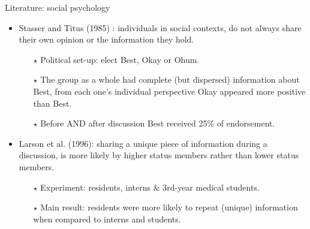 \documentclass[xcolor=table,handout]{beamer}
\begin{document}
\begin{frame}{Literature: social psychology}
\begin{itemize}
	\item Stasser and Titus (1985) : individuals in social contexts, do not always share their own opinion or the information they hold.
		\begin{itemize} \setlength\itemsep{1em}
			\item[{\color{gray}$\star$}] {\color{gray}Political set-up: elect Best, Okay or Ohum. }
			\item[{\color{gray}$\star$}] {\color{gray}The group as a whole had complete (but dispersed) information about Best, from each one’s individual perspective Okay appeared more positive than Best. }%
			\item[{\color{gray}$\star$}] {\color{gray}Before AND after discussion Best received 25\% of endorsement.} 
		\end{itemize}
		\item Larson et al. (1996): sharing a unique piece of information during a discussion, is more likely by higher status members rather than lower status members.
			\begin{itemize} \setlength\itemsep{1em}
				\item[{\color{gray}$\star$}] {\color{gray}Experiment: residents, interns \& 3rd-year medical students.}
				\item[{\color{gray}$\star$}] {\color{gray}Main result: residents were more likely to repeat (unique) information when compared to interns and students.}
			\end{itemize} 	
\end{itemize}
\end{frame}
%
\end{document}
